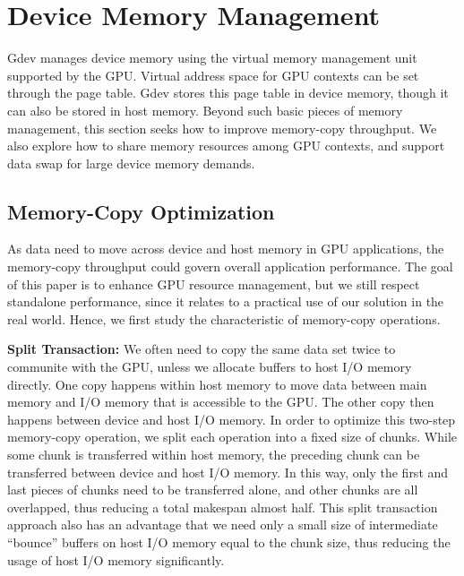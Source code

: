 \vspace{-0.25em}
\section{Device Memory Management}
\label{sec:memory_management}
\vspace{-0.25em}

Gdev manages device memory using the virtual memory management unit
supported by the GPU.
Virtual address space for GPU contexts can be set through the page
table.
Gdev stores this page table in device memory, though it can also be
stored in host memory.
Beyond such basic pieces of memory management, this section seeks how to
improve memory-copy throughput.
We also explore how to share memory resources among GPU contexts, and
support data swap for large device memory demands.

\vspace{-0.25em}
\subsection{Memory-Copy Optimization}
\label{sec:memory_copy}
\vspace{-0.25em}

As data need to move across device and host memory in GPU applications, 
the memory-copy throughput could govern overall application performance.
The goal of this paper is to enhance GPU resource management, but
we still respect standalone performance, since it relates to a practical
use of our solution in the real world.
Hence, we first study the characteristic of memory-copy operations.

\textbf{Split Transaction:}
We often need to copy the same data set twice to communite with the
GPU, unless we allocate buffers to host I/O memory directly.
One copy happens within host memory to move data between main memory
and I/O memory that is accessible to the GPU.
The other copy then happens between device and host I/O memory.
In order to optimize this two-step memory-copy operation, we split each
operation into a fixed size of chunks.
While some chunk is transferred within host memory, the preceding chunk
can be transferred between device and host I/O memory.
In this way, only the first and last pieces of chunks need to be
transferred alone, and other chunks are all overlapped, thus reducing a
total makespan almost half.
This split transaction approach also has an advantage that we need only
a small size of intermediate ``bounce'' buffers on host I/O memory equal
to the chunk size, thus reducing the usage of host I/O memory
significantly.

